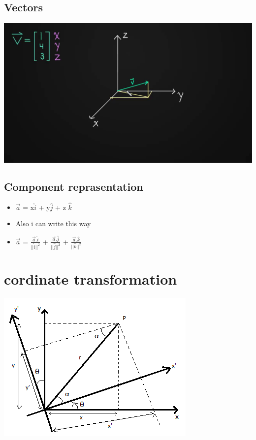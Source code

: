 \documentclass[11pt]{article}
\begin{document}
\subsection{Vectors}
\label{sec:org1ac6d76}
\begin{center}
\includegraphics[width=.9\linewidth]{./vect.jpg}
\end{center}
\subsection{Component reprasentation}
\label{sec:orgbe9e827}
\begin{itemize}
\item \(\vec a\) = x\(\hat i\) + y\(\hat j\) + z \(\hat k\)
\item Also i can write this way
\item \(\vec a\) = \(\frac{\vec a . \hat i}{||\hat i||^2}\) + \(\frac{\vec a . \hat j}{||\hat j||^2}\) + \(\frac{\vec a . \hat k}{||\hat k||^2}\)
\end{itemize}
\section{cordinate transformation}
\label{sec:orgcd258ff}
\begin{center}
\includegraphics[width=.9\linewidth]{./ct.png}
\end{center}
\end{document}
